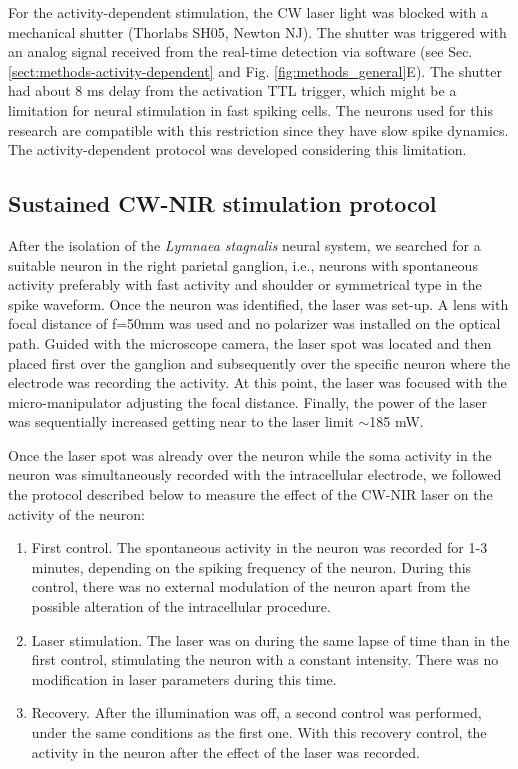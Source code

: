 For the activity-dependent stimulation, the CW laser light was blocked with a mechanical shutter (Thorlabs SH05, Newton NJ). The shutter was triggered with an analog signal received from the real-time detection via software (see Sec. \ref{sect:methods-activity-dependent} and Fig. \ref{fig:methods_general}E). The shutter had about 8 ms delay from the activation TTL trigger, which might be a limitation for neural stimulation in fast spiking cells. The neurons used for this research are compatible with this restriction since they have slow spike dynamics. The activity-dependent protocol was developed considering this limitation. 

\subsection{Sustained CW-NIR stimulation protocol}
\label{sect:sustained-protocol}
After the isolation of the \textit{Lymnaea stagnalis} neural system, we searched for a suitable neuron in the right parietal ganglion, i.e., neurons with spontaneous activity preferably with fast activity and shoulder or symmetrical type in the spike waveform. 
Once the neuron was identified, the laser was set-up. A lens with focal distance of f=50mm was used and no polarizer was installed on the optical path. Guided with the microscope camera, the laser spot was located and then placed first over the ganglion and subsequently over the specific neuron where the electrode was recording the activity. 
At this point, the laser was focused with the micro-manipulator adjusting the focal distance. Finally, the power of the laser was sequentially increased getting near to the laser limit $\sim$185 mW.

Once the laser spot was already over the neuron while the soma activity in the neuron was simultaneously recorded with the intracellular electrode, we followed the protocol described below to measure the effect of the CW-NIR laser on the activity of the neuron:

\begin{enumerate}
    \item First control. The spontaneous activity in the neuron was recorded for 1-3 minutes, depending on the spiking frequency of the neuron. During this control, there was no external modulation of the neuron apart from the possible alteration of the intracellular procedure.  
    \item Laser stimulation. The laser was on during the same lapse of time than in the first control, stimulating the neuron with a constant intensity. There was no modification in laser parameters during this time.
    \item Recovery. After the illumination was off, a second control was performed, under the same conditions as the first one. With this recovery control, the activity in the neuron after the effect of the laser was recorded.
\end{enumerate}

